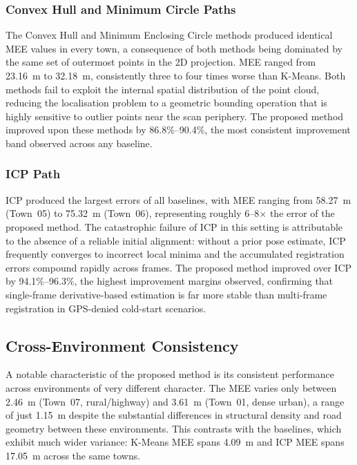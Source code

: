\documentclass[lettersize,journal]{IEEEtran}
\begin{document}
\subsubsection{Convex Hull and Minimum Circle Paths}
The Convex Hull and Minimum Enclosing Circle methods produced identical MEE
values in every town, a consequence of both methods being dominated by the
same set of outermost points in the 2D projection. MEE ranged from 23.16~m
to 32.18~m, consistently three to four times worse than K-Means. Both methods
fail to exploit the internal spatial distribution of the point cloud, reducing
the localisation problem to a geometric bounding operation that is highly
sensitive to outlier points near the scan periphery. The proposed method
improved upon these methods by 86.8\%--90.4\%, the most consistent improvement
band observed across any baseline.

\subsubsection{ICP Path}
ICP produced the largest errors of all baselines, with MEE ranging from
58.27~m (Town~05) to 75.32~m (Town~06), representing roughly 6--8$\times$ the
error of the proposed method. The catastrophic failure of ICP in this
setting is attributable to the absence of a reliable initial alignment: without
a prior pose estimate, ICP frequently converges to incorrect local minima and
the accumulated registration errors compound rapidly across frames. The
proposed method improved over ICP by 94.1\%--96.3\%, the highest improvement
margins observed, confirming that single-frame derivative-based estimation is
far more stable than multi-frame registration in GPS-denied cold-start
scenarios.

\subsection{Cross-Environment Consistency}

A notable characteristic of the proposed method is its consistent performance
across environments of very different character. The MEE varies only between
2.46~m (Town~07, rural/highway) and 3.61~m (Town~01, dense urban), a range
of just 1.15~m despite the substantial differences in structural density and
road geometry between these environments. This contrasts with the baselines,
which exhibit much wider variance: K-Means MEE spans 4.09~m and ICP MEE
spans 17.05~m across the same towns.
\end{document}
